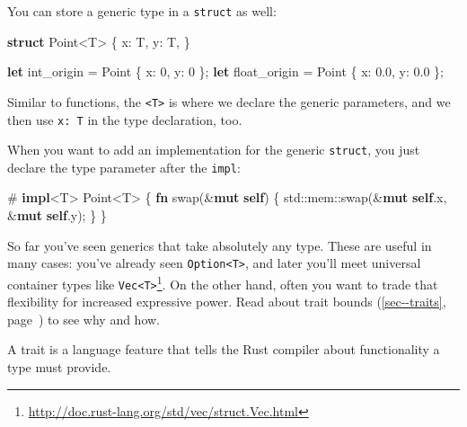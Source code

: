 \documentclass[a4paper,]{book}
\renewcommand*{\hyperref}[2][\ar]{%
  \def\ar{#2}%
  #2 (\autoref{#1}, page~\pageref{#1})}
\newenvironment{Shaded}{\begin{snugshade}}{\end{snugshade}}
\newcommand{\KeywordTok}[1]{\textcolor[rgb]{0.13,0.29,0.53}{\textbf{{#1}}}}
\newcommand{\DecValTok}[1]{\textcolor[rgb]{0.00,0.00,0.81}{{#1}}}
\newcommand{\NormalTok}[1]{{#1}}
\renewcommand{\href}[2]{#2\footnote{\url{#1}}}
\begin{document}
You can store a generic type in a \texttt{struct} as well:

\begin{Shaded}
\begin{Highlighting}[]
\KeywordTok{struct} \NormalTok{Point<T> \{}
    \NormalTok{x: T,}
    \NormalTok{y: T,}
\NormalTok{\}}

\KeywordTok{let} \NormalTok{int_origin = Point \{ x: }\DecValTok{0}\NormalTok{, y: }\DecValTok{0} \NormalTok{\};}
\KeywordTok{let} \NormalTok{float_origin = Point \{ x: }\DecValTok{0.0}\NormalTok{, y: }\DecValTok{0.0} \NormalTok{\};}
\end{Highlighting}
\end{Shaded}

Similar to functions, the \texttt{\textless{}T\textgreater{}} is where
we declare the generic parameters, and we then use \texttt{x:\ T} in the
type declaration, too.

When you want to add an implementation for the generic \texttt{struct},
you just declare the type parameter after the \texttt{impl}:

\begin{Shaded}
\begin{Highlighting}[]
\NormalTok{#}
\KeywordTok{impl}\NormalTok{<T> Point<T> \{}
    \KeywordTok{fn} \NormalTok{swap(&}\KeywordTok{mut} \KeywordTok{self}\NormalTok{) \{}
        \NormalTok{std::mem::swap(&}\KeywordTok{mut} \KeywordTok{self}\NormalTok{.x, &}\KeywordTok{mut} \KeywordTok{self}\NormalTok{.y);}
    \NormalTok{\}}
\NormalTok{\}}
\end{Highlighting}
\end{Shaded}

So far you've seen generics that take absolutely any type. These are
useful in many cases: you've already seen
\texttt{Option\textless{}T\textgreater{}}, and later you'll meet
universal container types like
\href{http://doc.rust-lang.org/std/vec/struct.Vec.html}{\texttt{Vec\textless{}T\textgreater{}}}.
On the other hand, often you want to trade that flexibility for
increased expressive power. Read about \hyperref[sec--traits]{trait
bounds} to see why and how.


A trait is a language feature that tells the Rust compiler about
functionality a type must provide.
\end{document}
